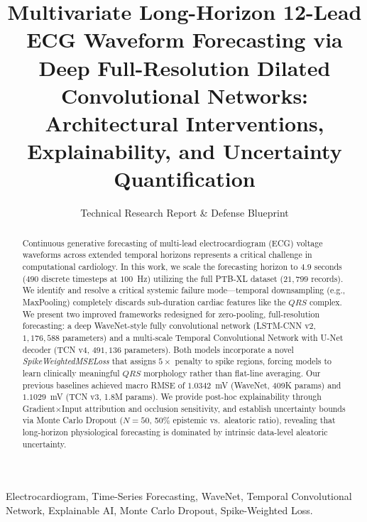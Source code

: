 \documentclass[10pt,journal,compsoc]{IEEEtran}
\begin{document}
\title{Multivariate Long-Horizon 12-Lead ECG Waveform Forecasting via Deep Full-Resolution Dilated Convolutional Networks: Architectural Interventions, Explainability, and Uncertainty Quantification}

\author{Technical Research Report \& Defense Blueprint}

\maketitle

\begin{abstract}
Continuous generative forecasting of multi-lead electrocardiogram (ECG) voltage waveforms across extended temporal horizons represents a critical challenge in computational cardiology. In this work, we scale the forecasting horizon to $4.9$ seconds ($490$ discrete timesteps at $100$~Hz) utilizing the full PTB-XL dataset ($21,799$ records). We identify and resolve a critical systemic failure mode---temporal downsampling (e.g., MaxPooling) completely discards sub-duration cardiac features like the $QRS$ complex. We present two improved frameworks redesigned for zero-pooling, full-resolution forecasting: a deep WaveNet-style fully convolutional network (LSTM-CNN v2, $1{,}176{,}588$ parameters) and a multi-scale Temporal Convolutional Network with U-Net decoder (TCN v4, $491{,}136$ parameters). Both models incorporate a novel \textit{SpikeWeightedMSELoss} that assigns $5\times$ penalty to spike regions, forcing models to learn clinically meaningful $QRS$ morphology rather than flat-line averaging. Our previous baselines achieved macro RMSE of $1.0342$~mV (WaveNet, 409K params) and $1.1029$~mV (TCN v3, 1.8M params). We provide post-hoc explainability through Gradient$\times$Input attribution and occlusion sensitivity, and establish uncertainty bounds via Monte Carlo Dropout ($N=50$, 50\% epistemic vs.\ aleatoric ratio), revealing that long-horizon physiological forecasting is dominated by intrinsic data-level aleatoric uncertainty.
\end{abstract}

\begin{IEEEkeywords}
Electrocardiogram, Time-Series Forecasting, WaveNet, Temporal Convolutional Network, Explainable AI, Monte Carlo Dropout, Spike-Weighted Loss.
\end{IEEEkeywords}

\end{document}
